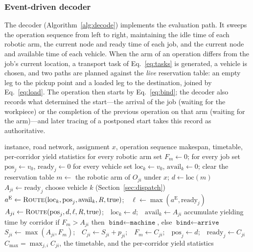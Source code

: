 \subsubsection{Event-driven decoder}
The decoder (Algorithm~\ref{alg:decode}) implements the evaluation path. It sweeps the operation sequence from left to right, maintaining the idle
time of each robotic arm, the current node and ready time of each job, and the current node and available time of each vehicle. When the
arm of an operation differs from the job's current location, a transport task of Eq.~\eqref{eq:tasks} is generated, a vehicle is chosen, and two paths are planned against the \emph{live}
reservation table: an empty leg to the pickup point and a loaded leg to the destination, joined by Eq.~\eqref{eq:load}.
The operation then starts by Eq.~\eqref{eq:bind}; the decoder also records what determined the start---the arrival of the job (waiting for the workpiece) or the completion of the previous operation on that arm (waiting for the arm)---and later tracing of a postponed start takes this record as authoritative.

\begin{algorithm}[t]
\caption{\textsc{Decode}: fitness from a complete conflict-free simulation}
\label{alg:decode}
\small
\begin{algorithmic}[1]
\Require instance, road network, assignment $x$, operation sequence
\Ensure makespan, timetable, per-corridor yield statistics
\State for every robotic arm set $F_m\gets 0$; for every job set $\mathrm{pos}_j\gets v_0$,
       $\mathrm{ready}_j\gets 0$
\State for every vehicle set $\mathrm{loc}_k\gets v_0$, $\mathrm{avail}_k\gets 0$; clear the reservation table
  \State $m\gets$ the robotic arm of $O_{ji}$ under $x$; $d\gets \mathrm{loc}(m)$
     \State $A_{ji}\gets \mathrm{ready}_j$ 
  \Else
     \State choose vehicle $k$ (Section~\ref{sec:dispatch})
     \State $a^{\mathrm{E}}\gets\textsc{Route}(\mathrm{loc}_k,\mathrm{pos}_j,
            \mathrm{avail}_k,R,\text{true})$;\ \ $\ell\gets\max(a^{\mathrm{E}},
            \mathrm{ready}_j)$ 
     \State $A_{ji}\gets\textsc{Route}(\mathrm{pos}_j,d,\ell,R,\text{true})$;\ \
            $\mathrm{loc}_k\gets d$;\ \ $\mathrm{avail}_k\gets A_{ji}$
     \State accumulate yielding time by corridor
  \EndIf
  \State if $F_m>A_{ji}$ then $\texttt{bind}\gets\texttt{machine}$, else
         $\texttt{bind}\gets\texttt{arrive}$ 
  \State $S_{ji}\gets\max(A_{ji},F_m)$;\ \ $C_{ji}\gets S_{ji}+p_{ji}$;\ \
         $F_m\gets C_{ji}$;\ \ $\mathrm{pos}_j\gets d$;\ \
         $\mathrm{ready}_j\gets C_{ji}$
\EndFor
\State \Return $C_{\max}=\max_{j,i} C_{ji}$, the timetable, and the per-corridor yield statistics
\end{algorithmic}
\end{algorithm}

